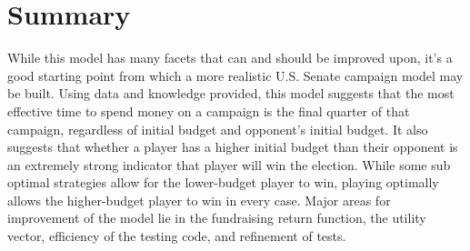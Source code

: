\documentclass[11pt]{article}
\begin{document}
\section{Summary}

While this model has many facets that can and should be improved upon, it's a
good starting point from which a more realistic U.S. Senate campaign model may
be built. Using data and knowledge provided, this model suggests that the most
effective time to spend money on a campaign is the final quarter of that
campaign, regardless of initial budget and opponent's initial budget. It also
suggests that whether a player has a higher initial budget than their opponent
is an extremely strong indicator that player will win the election. While some
sub optimal strategies allow for the lower-budget player to win, playing
optimally allows the higher-budget player to win in every case. Major areas for
improvement of the model lie in the fundraising return function, the utility
vector, efficiency of the testing code, and refinement of tests.
\end{document}
